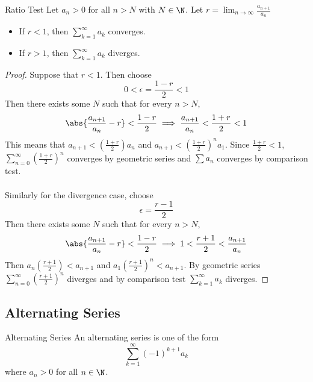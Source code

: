 \begin{thm}{Ratio Test}{} Let $a_n>0$ for all $n>N$ with $N\in\N$. Let $r=\lim_{n\to\infty}\frac{a_{n+1}}{a_n}$
\begin{itemize} 
\item If $r<1$, then $\sum_{k=1}^\infty a_k$ converges. 
\item If $r>1$, then $\sum_{k=1}^\infty a_k$ diverges. 
\end{itemize} \tcbline
\begin{proof} Suppose that $r<1$. Then choose $$0<\epsilon=\frac{1-r}{2}<1$$ Then there exists some $N$ such that for every $n>N$, $$\abs{\frac{a_{n+1}}{a_n}-r}<\frac{1-r}{2}\implies\frac{a_{n+1}}{a_n}<\frac{1+r}{2}<1$$ This means that $a_{n+1}<(\frac{1+r}{2})a_n$ and $a_{n+1}<(\frac{1+r}{2})^na_1$. Since $\frac{1+r}{2}<1$, $\sum_{n=0}^{\infty}(\frac{1+r}{2})^n$ converges by geometric series and $\sum a_n$ converges by comparison test. \\~\\
Similarly for the divergence case, choose $$\epsilon=\frac{r-1}{2}$$ Then there exists some $N$ such that for every $n>N$, $$\abs{\frac{a_{n+1}}{a_n}-r}<\frac{1-r}{2}\implies 1<\frac{r+1}{2}<\frac{a_{n+1}}{a_n}$$ Then $a_n(\frac{r+1}{2})<a_{n+1}$ and $a_1(\frac{r+1}{2})^n<a_{n+1}$. By geometric series $\sum_{n=0}^{\infty}(\frac{r+1}{2})^n$ diverges and by comparison test $\sum_{k=1}^\infty a_k$ diverges. 
\end{proof}
\end{thm}

\subsection{Alternating Series}
\begin{defn}{Alternating Series}{} An alternating series is one of the form $$\sum_{k=1}^{\infty}(-1)^{k+1}a_k$$ where $a_n>0$ for all $n\in\N$. 
\end{defn}

